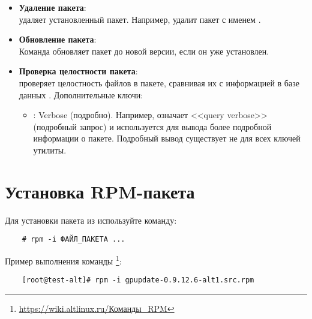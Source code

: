 \begin{itemize}
	\item \textbf{Удаление пакета}: \\
	 удаляет установленный пакет. Например,  удалит пакет с именем .
	
	\item \textbf{Обновление пакета}: \\
	Команда  обновляет пакет до новой версии, если он уже установлен.
	
	\item \textbf{Проверка целостности пакета}: \\
	 проверяет целостность файлов в пакете, сравнивая их с информацией в базе данных .
	Дополнительные ключи:
	\begin{itemize}
		\item \textbf{}: Verbose (подробно). Например,  означает <<query verbose>> (подробный запрос) и используется для вывода более подробной информации о пакете. Подробный вывод существует не для всех ключей утилиты.
	\end{itemize}
	
	
\end{itemize}

\section{Установка RPM-пакета}

Для установки пакета из  используйте команду: 
\begin{verbatim}
	# rpm -i ФАЙЛ_ПАКЕТА ...
\end{verbatim}


Пример выполнения команды \footnote{\href{https://wiki.altlinux.ru/Команды\_RPM}{https://wiki.altlinux.ru/Команды\_RPM}}: 
\begin{verbatim}
	[root@test-alt]# rpm -i gpupdate-0.9.12.6-alt1.src.rpm 
\end{verbatim}

